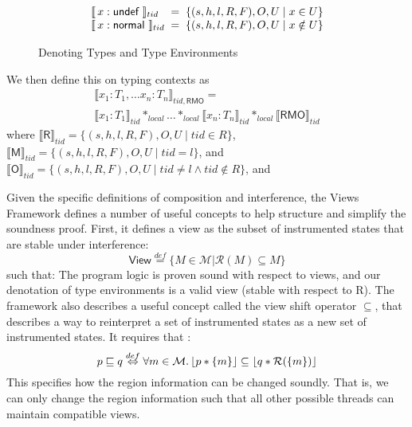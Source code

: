 \begin{figure*}[!htbp]
\[\begin{array}{l@{\;\;=\;\;}l}
\llbracket \, x : \textsf{undef }\rrbracket_{tid}
&

\{ 
(s,h,l,R,F), O,U 
\mid
x \in U\}
\\

\llbracket \, x : \textsf{normal }\rrbracket_{tid}
&

\{ 
(s,h,l,R,F), O,U 
\mid
x \notin U\}
\\
\end{array}
\]
\caption{Denoting Types and Type Environments}
\label{fig:denotingtypeenviroment}
\end{figure*}

We then define this on typing contexts as 
\begin{gather*}
\llbracket x_1 : T_1, \ldots x_n : T_n \rrbracket_{tid,\textsf{RMO}} = \\
\llbracket x_1 : T_1 \rrbracket_{tid}*_{local} \ldots *_{local} \llbracket x_n : T_n \rrbracket_{tid} *_{local} \llbracket \textsf{RMO} \rrbracket_{tid}
\end{gather*}
where
$\llbracket \textsf{R} \rrbracket_{tid} = \{ (s,h,l,R,F), O,U  \mid tid \in R \}$, 
$\llbracket \textsf{M} \rrbracket_{tid} = \{ (s,h,l,R,F), O,U  \mid tid = l \}$, and
$\llbracket \textsf{O} \rrbracket_{tid} = \{ (s,h,l,R,F), O,U  \mid tid \neq l \land tid \notin R \}$, and


Given the specific definitions of composition and interference, the Views Framework defines a number of useful concepts to help structure and simplify the soundness proof. First, it defines a view as the subset of instrumented states that are stable under interference:
\[ \textsf{View} \stackrel{def}{=} \{ M \in \mathcal{M} | \mathcal{R}(M) \subseteq M\} \] such that: 
The program logic is proven sound with respect to views, and our denotation of type environments is a valid view (stable with respect to R). The framework also describes a useful concept called the view shift operator $\subseteq$, that describes a way to reinterpret a set of instrumented states as a new set of instrumented states. It requires that :
\[p \sqsubseteq q \stackrel{def}{\Leftrightarrow} \forall m\in\mathcal{M} \ldotp \lfloor p * \{ m \} \rfloor \subseteq \lfloor q* \mathcal{R}(\{m\})\rfloor\]
This specifies how the region information can be changed soundly. That is, we can only change the region information such that all other possible threads can maintain compatible views.

